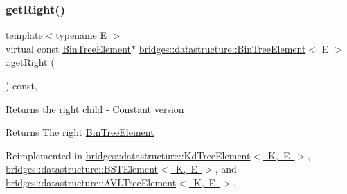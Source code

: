 \mbox{\label{classbridges_1_1datastructure_1_1_bin_tree_element_a795b1696d628b55dafb2bc1aa961843a}} 
\subsubsection{\texorpdfstring{get\+Right()}{getRight()}\hspace{0.1cm}{\footnotesize\ttfamily [2/2]}}
{\footnotesize\ttfamily template$<$typename E $>$ \\
virtual const \mbox{\hyperlink{classbridges_1_1datastructure_1_1_bin_tree_element}{Bin\+Tree\+Element}}$\ast$ \mbox{\hyperlink{classbridges_1_1datastructure_1_1_bin_tree_element}{bridges\+::datastructure\+::\+Bin\+Tree\+Element}}$<$ E $>$\+::get\+Right (\begin{DoxyParamCaption}{ }\end{DoxyParamCaption}) const\hspace{0.3cm}{\ttfamily [inline]}, {\ttfamily [virtual]}}

Returns the right child -\/ Constant version \begin{DoxyReturn}{Returns}
The right \mbox{\hyperlink{classbridges_1_1datastructure_1_1_bin_tree_element}{Bin\+Tree\+Element}} 
\end{DoxyReturn}


Reimplemented in \mbox{\hyperlink{classbridges_1_1datastructure_1_1_kd_tree_element_ae8d6007d3848b72cbfc11d2e29120781}{bridges\+::datastructure\+::\+Kd\+Tree\+Element$<$ K, E $>$}}, \mbox{\hyperlink{classbridges_1_1datastructure_1_1_b_s_t_element_a012f0eb09c3d62b14c73109e6ded0879}{bridges\+::datastructure\+::\+B\+S\+T\+Element$<$ K, E $>$}}, and \mbox{\hyperlink{classbridges_1_1datastructure_1_1_a_v_l_tree_element_a5a2c4b96b51da1daa3c0426882250acb}{bridges\+::datastructure\+::\+A\+V\+L\+Tree\+Element$<$ K, E $>$}}.

\mbox{\label{classbridges_1_1datastructure_1_1_bin_tree_element_a3b3caddd57fd31963b248b4dbcf3df27}} 
